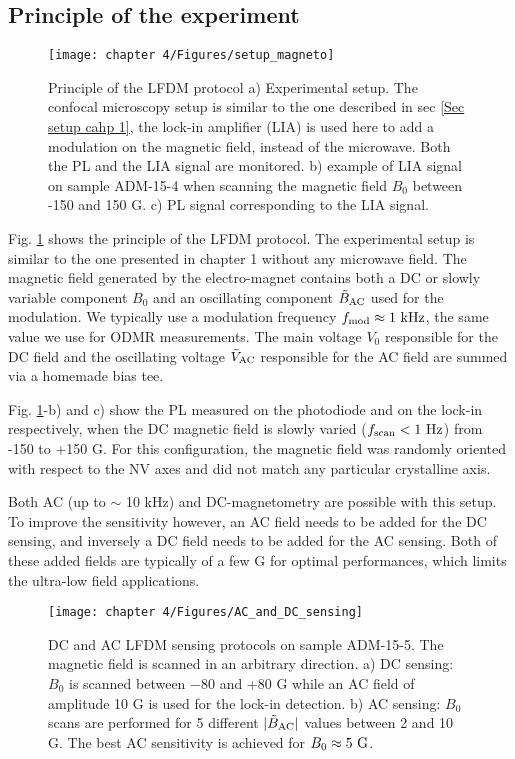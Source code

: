 \documentclass[a4paper, 11pt]{report}
\begin{document}
\subsection{Principle of the experiment}

\begin{figure}[h!]
\centering
\texttt{[image: chapter 4/Figures/setup\_magneto]}
\caption{Principle of the LFDM protocol a) Experimental setup. The confocal microscopy setup is similar to the one described in sec \ref{Sec setup cahp 1}, the lock-in amplifier (LIA) is used here to add a modulation on the magnetic field, instead of the microwave. Both the PL and the LIA signal are monitored. b) example of LIA signal on sample ADM-15-4 when scanning the magnetic field $B_0$ between -150 and 150 G. c) PL signal corresponding to the LIA signal.}
\label{setup magneto}
\end{figure}

Fig. \ref{setup magneto} shows the principle of the LFDM protocol. The experimental setup is similar to the one presented in chapter 1 without any microwave field. The magnetic field generated by the electro-magnet contains both a DC or slowly variable component $B_0$ and an oscillating component $\tilde{B}_{\rm AC}$ used for the modulation. We typically use a modulation frequency $f_{\rm mod} \approx 1\ \rm kHz$, the same value we use for ODMR measurements. The main voltage $V_0$ responsible for the DC field and the oscillating voltage $\tilde{V}_{\rm AC}$ responsible for the AC field are summed via a homemade bias tee.

Fig. \ref{setup magneto}-b) and c) show the PL measured on the photodiode and on the lock-in respectively, when the DC magnetic field is slowly varied ($f_{\rm scan}<1\ \rm Hz$) from -150 to +150 G. For this configuration, the magnetic field was randomly oriented with respect to the NV axes and did not match any particular crystalline axis.

Both AC (up to $\sim$ 10 kHz) and DC-magnetometry are possible with this setup. To improve the sensitivity however, an AC field needs to be added for the DC sensing, and inversely a DC field needs to be added for the AC sensing. Both of these added fields are typically of a few G for optimal performances, which limits the ultra-low field applications.

\begin{figure}[h!]
\centering
\texttt{[image: chapter 4/Figures/AC\_and\_DC\_sensing]}
\caption{DC and AC LFDM sensing protocols on sample ADM-15-5. The magnetic field is scanned in an arbitrary direction. a) DC sensing: $B_0$ is scanned between $-$80 and +80 G while an AC field of amplitude 10 G is used for the lock-in detection. b) AC sensing: $B_0$ scans are performed for 5 different $|\tilde B_{\rm AC}|$ values between 2 and 10 G. The best AC sensitivity is achieved for $B_0\approx 5\ \rm G$.}
\label{AC and DC sensing}
\end{figure}
\end{document}
